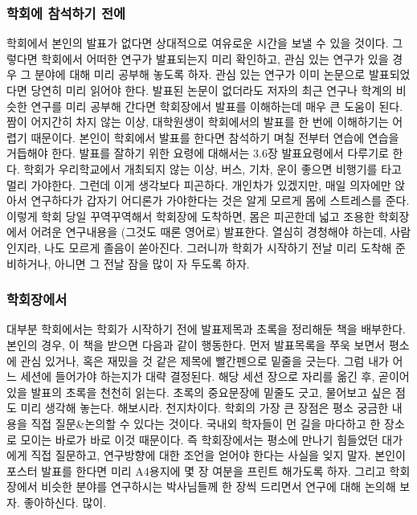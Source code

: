 \subsubsection{학회에 참석하기 전에}
학회에서 본인의 발표가 없다면 상대적으로 여유로운 시간을 보낼 수 있을
것이다. 그렇다면 학회에서 어떠한 연구가 발표되는지 미리 확인하고, 관심 있는
연구가 있을 경우 그 분야에 대해 미리 공부해 놓도록 하자. 관심 있는 연구가 이미
논문으로 발표되었다면 당연히 미리 읽어야 한다. 발표된 논문이 없더라도 저자의 최근
연구나 학계의 비슷한 연구를 미리 공부해 간다면 학회장에서 발표를 이해하는데 매우
큰 도움이 된다. 짬이 어지간히 차지 않는 이상, 대학원생이 학회에서의 발표를 한
번에 이해하기는 어렵기 때문이다. 본인이 학회에서 발표를 한다면 참석하기 며칠
전부터 연습에 연습을 거듭해야 한다. 발표를 잘하기 위한 요령에 대해서는 3.6장
발표요령에서 다루기로 한다.  학회가 우리학교에서 개최되지 않는 이상, 버스, 기차,
운이 좋으면 비행기를 타고 멀리 가야한다. 그런데 이게 생각보다 피곤하다. 개인차가
있겠지만, 매일 의자에만 앉아서 연구하다가 갑자기 어디론가 가야한다는 것은 알게
모르게 몸에 스트레스를 준다. 이렇게 학회 당일 꾸역꾸역해서 학회장에 도착하면,
몸은 피곤한데 넓고 조용한 학회장에서 어려운 연구내용을 (그것도 때론 영어로)
발표한다. 열심히 경청해야 하는데, 사람인지라, 나도 모르게 졸음이
쏟아진다. 그러니까 학회가 시작하기 전날 미리 도착해 준비하거나, 아니면 그 전날
잠을 많이 자 두도록 하자.

\subsubsection{학회장에서}
대부분 학회에서는 학회가 시작하기 전에 발표제목과 초록을 정리해둔 책을
배부한다. 본인의 경우, 이 책을 받으면 다음과 같이 행동한다. 먼저 발표목록을 쭈욱
보면서 평소에 관심 있거나, 혹은 재밌을 것 같은 제목에 빨간펜으로 밑줄을
긋는다. 그럼 내가 어느 세션에 들어가야 하는지가 대략 결정된다. 해당 세션 장으로
자리를 옮긴 후, 곧이어 있을 발표의 초록을 천천히 읽는다. 초록의 중요문장에 밑줄도
긋고, 물어보고 싶은 점도 미리 생각해 놓는다. 해보시라. 천지차이다.  학회의 가장
큰 장점은 평소 궁금한 내용을 직접 질문\&논의할 수 있다는 것이다. 국내외 학자들이
먼 길을 마다하고 한 장소로 모이는 바로가 바로 이것 때문이다. 즉 학회장에서는
평소에 만나기 힘들었던 대가에게 직접 질문하고, 연구방향에 대한 조언을 얻어야
한다는 사실을 잊지 말자. 본인이 포스터 발표를 한다면 미리 A4용지에 몇 장 여분을
프린트 해가도록 하자. 그리고 학회장에서 비슷한 분야를 연구하시는 박사님들께 한
장씩 드리면서 연구에 대해 논의해 보자. 좋아하신다. 많이.


